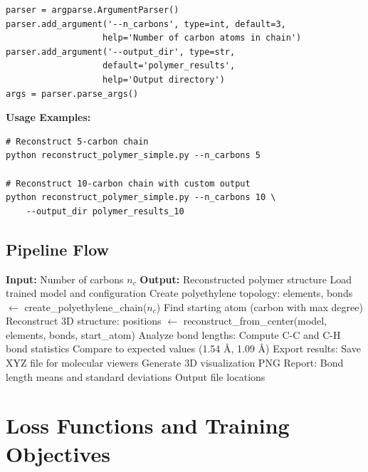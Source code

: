 \documentclass[11pt,a4paper]{article}
\begin{document}
\begin{lstlisting}[caption={CLI Arguments (lines 176-182)}]
parser = argparse.ArgumentParser()
parser.add_argument('--n_carbons', type=int, default=3,
                   help='Number of carbon atoms in chain')
parser.add_argument('--output_dir', type=str,
                   default='polymer_results',
                   help='Output directory')
args = parser.parse_args()
\end{lstlisting}

\textbf{Usage Examples:}
\begin{verbatim}
# Reconstruct 5-carbon chain
python reconstruct_polymer_simple.py --n_carbons 5

# Reconstruct 10-carbon chain with custom output
python reconstruct_polymer_simple.py --n_carbons 10 \
    --output_dir polymer_results_10
\end{verbatim}

\subsection{Pipeline Flow}

\begin{algorithm}
\caption{Polymer Reconstruction Pipeline}
\begin{algorithmic}[1]
\State \textbf{Input:} Number of carbons $n_c$
\State \textbf{Output:} Reconstructed polymer structure
\State
\State Load trained model and configuration
\State
\State Create polyethylene topology:
\State \quad elements, bonds $\gets$ create\_polyethylene\_chain($n_c$)
\State
\State Find starting atom (carbon with max degree)
\State
\State Reconstruct 3D structure:
\State \quad positions $\gets$ reconstruct\_from\_center(model, elements, bonds, start\_atom)
\State
\State Analyze bond lengths:
\State \quad Compute C-C and C-H bond statistics
\State \quad Compare to expected values (1.54 Å, 1.09 Å)
\State
\State Export results:
\State \quad Save XYZ file for molecular viewers
\State \quad Generate 3D visualization PNG
\State
\State Report:
\State \quad Bond length means and standard deviations
\State \quad Output file locations
\end{algorithmic}
\end{algorithm}

\clearpage

\section{Loss Functions and Training Objectives}
\end{document}
